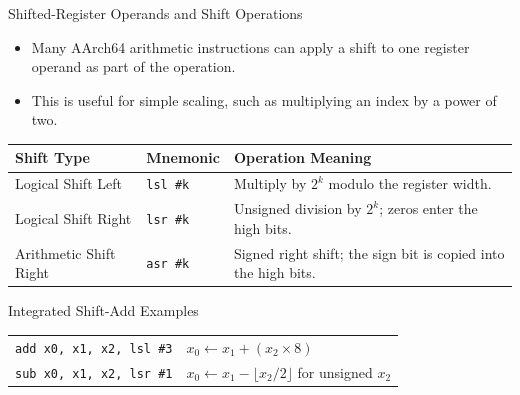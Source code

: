 \documentclass[aspectratio=169,11pt,t]{beamer}
\newcommand{\code}[1]{\texttt{#1}}
\begin{document}
\begin{frame}{Shifted-Register Operands and Shift Operations}
\begin{itemize}\setlength{\itemsep}{5pt}
  \item Many AArch64 arithmetic instructions can apply a shift to one register operand as part of the operation.
  \item This is useful for simple scaling, such as multiplying an index by a power of two.
\end{itemize}

\vspace{0.12cm}
\begin{center}
\scriptsize
\setlength{\tabcolsep}{4pt}
\begin{tabular}{p{}p{}p{}}
\toprule
\textbf{Shift Type} & \textbf{Mnemonic} & \textbf{Operation Meaning} \\
\midrule
Logical Shift Left & \code{lsl \#k} & Multiply by $2^k$ modulo the register width. \\
Logical Shift Right & \code{lsr \#k} & Unsigned division by $2^k$; zeros enter the high bits. \\
Arithmetic Shift Right & \code{asr \#k} & Signed right shift; the sign bit is copied into the high bits. \\
\bottomrule
\end{tabular}
\end{center}

\vspace{0.10cm}
\begin{block}{Integrated Shift-Add Examples}
\footnotesize
{}
\begin{tabular}{ll}
\code{add x0, x1, x2, lsl \#3} & $x_0 \leftarrow x_1 + (x_2 \times 8)$ \\
\code{sub x0, x1, x2, lsr \#1} & $x_0 \leftarrow x_1 - \lfloor x_2/2 \rfloor$ for unsigned $x_2$ \\
\end{tabular}
\end{block}
\end{frame}






\end{document}
